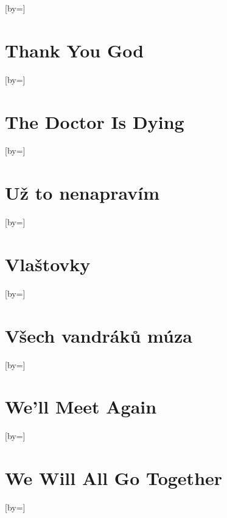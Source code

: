 \documentclass{article}
\begin{document}
\begin{songs}{}
\begin{song}{}[by={}]
\endverse
\end{song}

\section{Thank You God}
\begin{song}{}[by={}]
\beginverse

\endverse
\end{song}

\section{The Doctor Is Dying}
\begin{song}{}[by={}]
\beginverse

\endverse
\end{song}

\section{Už to nenapravím}
\begin{song}{}[by={}]
\beginverse

\endverse
\end{song}

\section{Vlaštovky}
\begin{song}{}[by={}]
\beginverse

\endverse
\end{song}

\section{Všech vandráků múza}
\begin{song}{}[by={}]
\beginverse

\endverse
\end{song}

\section{We'll Meet Again}
\begin{song}{}[by={}]
\beginverse

\endverse
\end{song}

\section{We Will All Go Together}
\begin{song}{}[by={}]
\beginverse


\end{song}
\end{songs}
\end{document}

